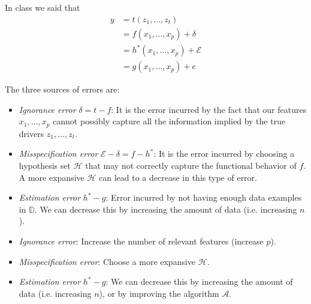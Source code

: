 \documentclass[12pt]{article}
\begin{document}
\begin{enumerate}

In class we said that
\begin{align*}
	y &= t(z_1,\ldots,z_t)\\
	&=f(x_1,\ldots,x_p) + \delta\\
	&=h^*(x_1,\ldots,x_p) + \mathcal{E}\\
	&=g(x_1,\ldots,x_p)+e
\end{align*}

The three sources of errors are:
\begin{itemize}
	\item \emph{Ignorance error} $\delta= t-f$: It is the error incurred by the fact that
	our features $x_1,\ldots,x_p$ cannot possibly capture all the information implied by the
	true drivers $z_1,\ldots,z_t$.
	\item \emph{Misspecification error} $\mathcal{E}-\delta=f-h^*$: It is the error incurred
	by choosing a hypothesis set $\mathcal{H}$ that may not correctly capture the functional
	behavior of $f$. A more expansive $\mathcal{H}$ can lead to a decrease in this type of error.
	\item \emph{Estimation error} $h^*-g$: Error incurred by not having enough data examples
	in $\mathbb{D}$. We can decrease this by increasing the amount of data (i.e. increasing $n$).
\end{itemize}


\begin{itemize}
	\item \emph{Ignorance error}: Increase the number of relevant features (increase $p$).
	\item \emph{Misspecification error}: Choose a more expansive $\mathcal{H}$.
	\item \emph{Estimation error} $h^*-g$:  We can decrease this by increasing the amount of data (i.e. increasing $n$), or by improving the algorithm $\mathcal{A}$.
\end{itemize}



\end{enumerate}
\end{document}
